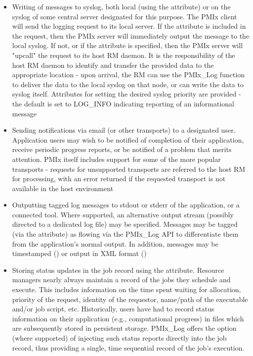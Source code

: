 \begin{itemize}
\item Writing of messages to syslog, both local (using the  attribute) or on the syslog of some central server designated for this purpose. The PMIx client will send the logging request to its local server. If the  attribute is included in the request, then the PMIx server will immediately output the message to the local syslog. If not, or if the  attribute is specified, then the PMIx server will "upcall" the request to its host RM daemon. It is the responsibility of the host RM daemon to identify and transfer the provided data to the appropriate location - upon arrival, the RM can use the PMIx_Log function to deliver the data to the local syslog on that node, or can write the data to syslog itself. Attributes for setting the desired syslog priority are provided - the default is set to LOG_INFO indicating reporting of an informational message

\item Sending notifications via email (or other transports) to a designated user. Application users may wish to be notified of completion of their application, receive periodic progress reports, or be notified of a problem that merits attention. PMIx itself includes support for some of the more popular transports - requests for unsupported transports are referred to the host RM for processing, with an error returned if the requested transport is not available in the host environment
\item Outputting tagged log messages to stdout or stderr of the application, or a connected tool. Where supported, an alternative output stream (possibly directed to a dedicated log file) may be specified. Messages may be tagged (via the  attribute) as flowing via the PMIx_Log API to differentiate them from the application's normal output. In addition, messages may be timestamped () or output in XML format ()

\item Storing status updates in the job record using the  attribute. Resource managers nearly always maintain a record of the jobs they schedule and execute. This includes information on the time spent waiting for allocation, priority of the request, identity of the requestor, name/path of the executable and/or job script, etc. Historically, users have had to record status information on their application (e.g., computational progress) in files which are subsequently stored in persistent storage. PMIx_Log offers the option (where supported) of injecting such status reports directly into the job record, thus providing a single, time sequential record of the job's execution.


\end{itemize}
